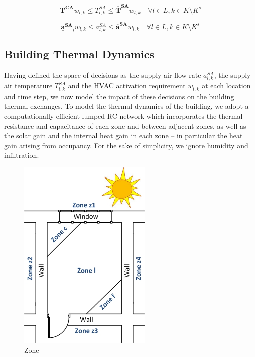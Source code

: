 \begin{equation} \label{eq:hvac_standby_TSA}
\bm{T^{CA}} w_{l,k} \leq T_{l,k}^{SA} \leq \bm{\overline{T}^{SA}} w_{l,k}  \quad \forall l \in L, k \in K \setminus K^s
\end{equation}

\begin{equation} \label{eq:hvac_standby_ASA}
\bm{\underline{a}^{SA}}_{l} w_{l,k} \leq a_{l,k}^{SA} \leq \bm{\overline{a}^{SA}} w_{l,k}  \quad \forall l \in L, k \in K \setminus K^s
\end{equation}

\subsection{Building Thermal Dynamics} \label{mip:thermal}
Having defined the space of decisions as the supply air flow rate $a_{l,k}^{SA}$, the supply air temperature $T_{l,k}^{SA}$ and the HVAC
activation requirement $w_{l,k}$ at each location and time step, we now model the impact of these decisions on the building thermal
exchanges.  To model the thermal dynamics of the building, we adopt a computationally efficient lumped RC-network \citep{gouda2000low} which
incorporates the thermal resistance and capacitance of each zone and between adjacent zones, as well as the solar gain and the internal
heat gain in each zone -- in particular the heat gain arising from occupancy. For the sake of simplicity, we ignore humidity and
infiltration.

\begin{figure}[t]
\centering
	\includegraphics[width=2.5in,keepaspectratio]{./figs/zone1.jpg}
\caption{Zone}
\label{fig:zone}
\end{figure}

